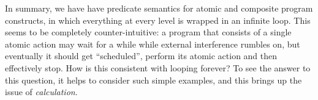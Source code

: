 In summary,
we have have predicate semantics for atomic and composite program
constructs,
in which everything at every level is wrapped in an infinite loop.
This seems to be completely counter-intuitive:
a program that consists of a single atomic action may wait
for a while while external interference rumbles on,
but eventually it should get ``scheduled'', perform its atomic action
and then effectively stop.
How is this consistent with looping forever?
To see the answer to this question,
it helps to consider such simple examples,
and this brings up the issue of \emph{calculation}.
